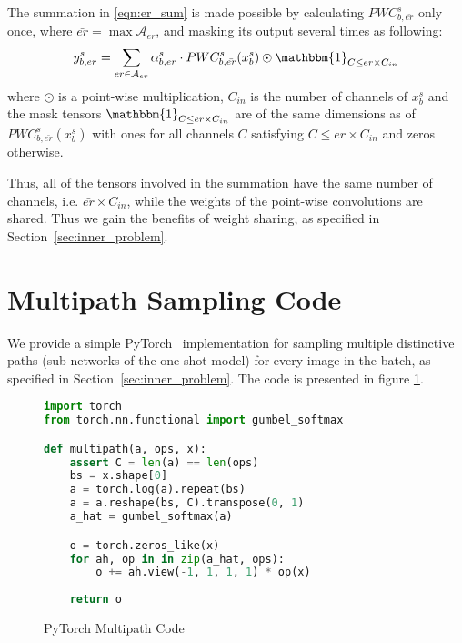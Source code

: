 \documentclass[dvipsnames,table,xcdraw]{article}
\begin{document}
The summation in \eqref{eqn:er_sum} is made possible by calculating $PWC^s_{b,\bar{er}}$ only once, where $\bar{er}=\max\mathcal{A}_{er}$, and masking its output several times as following:
\begin{align}\label{eqn:er_sum_mask}
    y^s_{b, er} = \sum_{er\in\mathcal{A}_{er}} \alpha^s_{b, er}\cdot PWC^s_{b,\bar{er}}(x^s_b)\odot \mathbbm{1}_{C\leq er\times C_{in}}
\end{align}
where $\odot$ is a point-wise multiplication, $C_{in}$ is the number of channels of $x^s_b$ and the mask tensors $\mathbbm{1}_{C\leq er\times C_{in}}$ are of the same dimensions as of $PWC^s_{b,\bar{er}}(x^s_b)$ with ones for all channels $C$ satisfying $C\leq er\times C_{in}$ and zeros otherwise.

Thus, all of the tensors involved in the summation have the same number of channels, i.e. $\bar{er}\times C_{in}$, while the weights of the point-wise convolutions are shared. Thus we gain the benefits of weight sharing, as specified in Section~\ref{sec:inner_problem}.

\section{Multipath Sampling Code}
We provide a simple PyTorch~\cite{pytorch} implementation for sampling multiple distinctive paths (sub-networks of the one-shot model) for every image in the batch, as specified in Section~\ref{sec:inner_problem}.
The code is presented in figure \ref{code:multipath}.
\begin{figure}[htb]
\begin{lstlisting}[language=Python]
import torch
from torch.nn.functional import gumbel_softmax

def multipath(a, ops, x):
    assert C = len(a) == len(ops)
    bs = x.shape[0]
    a = torch.log(a).repeat(bs)
    a = a.reshape(bs, C).transpose(0, 1)
    a_hat = gumbel_softmax(a)

    o = torch.zeros_like(x)
    for ah, op in in zip(a_hat, ops):
        o += ah.view(-1, 1, 1, 1) * op(x)
    
    return o
\end{lstlisting}
\caption{PyTorch Multipath Code}\label{code:multipath}
\end{figure}


 
\newpage
\end{document}
